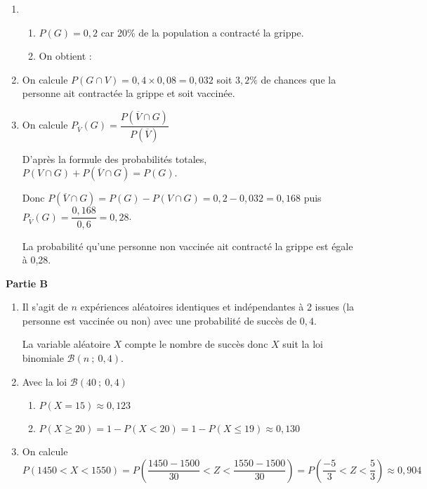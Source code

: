 \documentclass[10pt]{article}
\begin{document}
\begin{enumerate}
	\item 
	\begin{enumerate}
		\item $P(G)=0,2$ car 20\% de la population a contracté la grippe.
		\item On obtient :
		\begin{center}
\end{center}
	\end{enumerate}
	\item On calcule $P(G \cap V) = 0,4 \times 0,08 = 0,032$ soit $3,2\%$ de chances que la personne ait contractée la grippe et soit vaccinée.
	\item On calcule $P_{\overline{V}} (G) =\dfrac{P\left(\overline{V} \cap G\right) }{P\left(\overline{V}\right)}$\smallskip 
	
D'après la formule des probabilités totales, $P(V \cap G) + P\left(\overline{V} \cap G\right) = P\left(G\right)$.\smallskip 
	
Donc $P\left(\overline{V} \cap G\right) = P(G) - P(V \cap G) = 0,2 - 0,032 = 0,168$ puis $P_{\overline{V}} (G) = \dfrac{0,168}{0,6} =0,28$.

La probabilité qu'une personne non vaccinée ait contracté la grippe est égale à 0,28.
\end{enumerate}

\bigskip 

\textbf{Partie B}

\medskip

\begin{enumerate}
	\item Il s'agit de $n$ expériences aléatoires identiques et indépendantes à 2 issues (la personne est vaccinée ou non) avec une probabilité de succès de $0,4$.\smallskip 
	
La variable aléatoire $X$ compte le nombre de succès donc $X$ suit la loi binomiale $\mathscr{B}(n~;~0,4)$.
	\item Avec la loi $\mathscr{B}(40~;~0,4)$
	\begin{enumerate}
		\item $P(X=15) \approx 0,123$
		\item $P(X \geqslant 20) = 1- P(X < 20) =  1- P(X \leqslant 19) \approx 0,130$
	\end{enumerate}
	\item On calcule $P(1450 < X < 1550) = P\left( \dfrac{1450-1500}{30} < Z < \dfrac{1550-1500}{30} \right) =  P\left( \dfrac{-5}{3} < Z < \dfrac{5}{3} \right) \approx 0,904$
	\end{enumerate}\bigskip 
	
\end{document}
